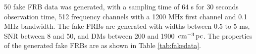 50 fake FRB data was generated, with a sampling time of 64 {\textmu}s for 30 seconds observation time, 512 frequency channels with a 1200 MHz first channel and 0.1 MHz bandwidth. The fake FRBs are generated with widths between 0.5 to 5 ms, SNR between 8 and 50, and DMs between 200 and 1900 $\,\text{cm}^{-3}\,\text{pc}$. The properties of the generated fake FRBs are as shown in Table \ref{tab:fakedata}.

